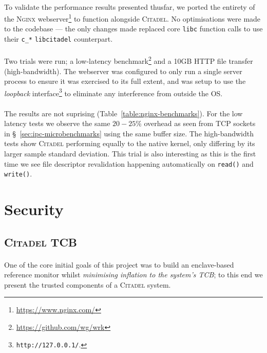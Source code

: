 \paragraph{} To validate the performance results presented thusfar, we ported the entirety of the \textsc{Nginx} webserver\footnote{\url{https://www.nginx.com/}} to function alongside \textsc{Citadel}. No optimisations were made to the codebase --- the only changes made replaced core \texttt{libc} function calls to use their \texttt{c\_*} \texttt{libcitadel} counterpart.

\paragraph{} Two trials were run; a low-latency benchmark\footnote{\url{https://github.com/wg/wrk}} and a 10GB HTTP file transfer (high-bandwidth). The webserver was configured to only run a single server process to ensure it was exercised to its full extent, and was setup to use the \textit{loopback} interface\footnote{\texttt{http://127.0.0.1/}.} to eliminate any interference from outside the OS. 

\paragraph{} The results are not suprising (Table~\ref{table:nginx-benchmarks}). For the low latency tests we observe the same $20-25$\% overhead as seen from TCP sockets in §~\ref{sec:ipc-microbenchmarks} using the same buffer size. The high-bandwidth tests show \textsc{Citadel} performing equally to the native kernel, only differing by its larger sample standard deviation. This trial is also interesting as this is the first time we see file descriptor revalidation happening automatically on \texttt{read()} and \texttt{write()}. 





\section{Security}

\subsection{\textsc{Citadel} TCB}
\label{sec:citadel-tcb}

\paragraph{} One of the core initial goals of this project was to build an enclave-based reference monitor whilst \textit{minimising inflation to the system's TCB}; to this end we present the trusted components of a \textsc{Citadel} system.

